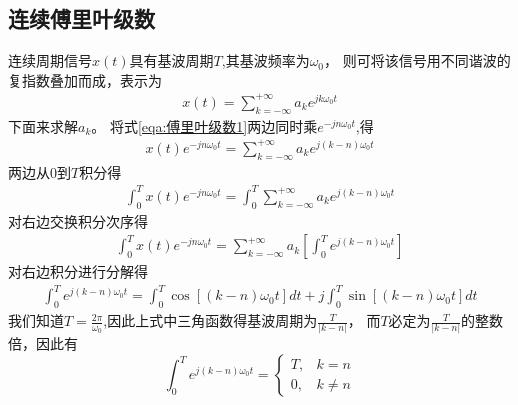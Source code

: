 \subsection{连续傅里叶级数}

连续周期信号$x(t)$具有基波周期$T$,其基波频率为$\omega_{0}$，
则可将该信号用不同谐波的复指数叠加而成，表示为
\begin{equation}
    \begin{aligned}
        x(t) = \sum_{k=-\infty}^{+\infty}a_{k}e^{jk\omega_{0}t}
    \end{aligned}
    \label{eqa:傅里叶级数1}
\end{equation}
下面来求解$a_{k}$。
将式\ref{eqa:傅里叶级数1}两边同时乘$e^{-jn\omega_{0}t}$,得
\begin{equation}
    \begin{aligned}
        x(t)e^{-jn\omega_{0}t} = \sum_{k=-\infty}^{+\infty}a_{k}e^{j(k-n)\omega_{0}t}
    \end{aligned}
    \label{eqa:傅里叶级数2}
\end{equation}
两边从$0$到$T$积分得
\begin{equation}
    \begin{aligned}
        \int_{0}^{T}x(t)e^{-jn\omega_{0}t} = 
        \int_{0}^{T}\sum_{k=-\infty}^{+\infty}a_{k}e^{j(k-n)\omega_{0}t}
    \end{aligned}
    \label{eqa:傅里叶级数3}
\end{equation}
对右边交换积分次序得
\begin{equation}
    \begin{aligned}
        \int_{0}^{T}x(t)e^{-jn\omega_{0}t} = 
        \sum_{k=-\infty}^{+\infty}a_{k}[\int_{0}^{T}e^{j(k-n)\omega_{0}t}]
    \end{aligned}
    \label{eqa:傅里叶级数4}
\end{equation}
对右边积分进行分解得
\begin{equation}
    \begin{aligned}
        \int_{0}^{T}e^{j(k-n)\omega_{0}t} = 
        \int_{0}^{T}\cos[(k-n)\omega_{0}t]dt + j\int_{0}^{T}\sin[(k-n)\omega_{0}t]dt
    \end{aligned}
    \label{eqa:傅里叶级数5}
\end{equation}
我们知道$T = \frac{2\pi}{\omega_{0}}$,因此上式中三角函数得基波周期为$\frac{T}{|k-n|}$，
而$T$必定为$\frac{T}{|k-n|}$的整数倍，因此有
\begin{equation}
    \int_{0}^{T}e^{j(k-n)\omega_{0}t} = 
    \left\{
    \begin{aligned}
        T,&k=n\\
        0,&k\neq n
    \end{aligned}
    \right.
    \label{eqa:傅里叶级数6}
\end{equation}
